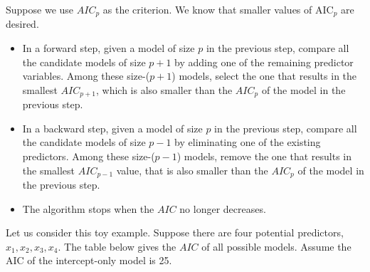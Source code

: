 \documentclass[
]{book}
\providecommand{\tightlist}{%
  \setlength{\itemsep}{0pt}\setlength{\parskip}{0pt}}
\begin{document}
Suppose we use \(AIC_p\) as the criterion. We know that smaller values of \(\mbox{AIC}_{p}\) are desired.

\begin{itemize}
\tightlist
\item
  In a forward step, given a model of size \(p\) in the previous step, compare all the candidate models of size \(p+1\) by adding one of the remaining predictor variables. Among these size-(\(p+1\)) models, select the one that results in the smallest \(AIC_{p+1}\), which is also smaller than the \(AIC_p\) of the model in the previous step.
\item
  In a backward step, given a model of size \(p\) in the previous step, compare all the candidate models of size \(p-1\) by eliminating one of the existing predictors. Among these size-(\(p-1\)) models, remove the one that results in the smallest \(AIC_{p-1}\) value, that is also smaller than the \(AIC_p\) of the model in the previous step.
\item
  The algorithm stops when the \(AIC\) no longer decreases.
\end{itemize}

Let us consider this toy example. Suppose there are four potential predictors, \(x_1,x_2,x_3,x_4\). The table below gives the \(AIC\) of all possible models. Assume the AIC of the intercept-only model is 25.
\end{document}

